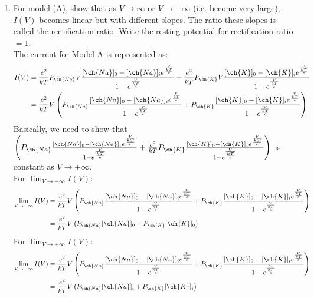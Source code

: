 \documentclass[11pt]{article}
\begin{document}
\begin{enumerate}[label=\arabic*.]
\begin{enumerate}[label=(\alph*)]
\item
For model (A), show that as $V \rightarrow \infty$ or $V \rightarrow -\infty$ (i.e. become very large), $I(V)$ becomes linear but with different slopes. The ratio these slopes is called the rectification ratio. Write the resting potential for rectification ratio $= 1$.
\vspace*{1\baselineskip}
\\
The current for Model A is represented as:
\begin{align*}
I(V) &= \frac{e^2} {kT} P_{\ch{Na}} V \frac{[\ch{Na}]_0 - [\ch{Na}]_i e^{\frac{V} {\frac{kT} {e}}}} {1 - e^{\frac{V} {\frac{kT} {e}}}} + \frac{e^2} {kT} P_{\ch{K}} V \frac{[\ch{K}]_0 - [\ch{K}]_i e^{\frac{V} {\frac{kT} {e}}}} {1 - e^{\frac{V} {\frac{kT} {e}}}} \\
&= \frac{e^2} {kT} V \left(P_{\ch{Na}} \frac{[\ch{Na}]_0 - [\ch{Na}]_i e^{\frac{V} {\frac{kT} {e}}}} {1 - e^{\frac{V} {\frac{kT} {e}}}} + P_{\ch{K}} \frac{[\ch{K}]_0 - [\ch{K}]_i e^{\frac{V} {\frac{kT} {e}}}} {1 - e^{\frac{V} {\frac{kT} {e}}}}\right)
\end{align*}
Basically, we need to show that $\left(P_{\ch{Na}} \frac{[\ch{Na}]_0 - [\ch{Na}]_i e^{\frac{V} {\frac{kT} {e}}}} {1 - e^{\frac{V} {\frac{kT} {e}}}} + \frac{e^2} {kT} P_{\ch{K}} \frac{[\ch{K}]_0 - [\ch{K}]_i e^{\frac{V} {\frac{kT} {e}}}} {1 - e^{\frac{V} {\frac{kT} {e}}}}\right)$ is constant as $V \rightarrow \pm \infty$. \\
For $\lim_{V \rightarrow -\infty} I(V)$:
\begin{align*}
\lim_{V \rightarrow -\infty} I(V) &= \frac{e^2} {kT} V \left(P_{\ch{Na}} \frac{[\ch{Na}]_0 - [\ch{Na}]_i e^{\frac{V} {\frac{kT} {e}}}} {1 - e^{\frac{V} {\frac{kT} {e}}}} + P_{\ch{K}} \frac{[\ch{K}]_0 - [\ch{K}]_i e^{\frac{V} {\frac{kT} {e}}}} {1 - e^{\frac{V} {\frac{kT} {e}}}}\right) \\
&= \frac{e^2} {kT} V \left(P_{\ch{Na}} [\ch{Na}]_0 + P_{\ch{K}} [\ch{K}]_0\right) \\
\end{align*}
For $\lim_{V \rightarrow +\infty} I(V)$:
\begin{align*}
\lim_{V \rightarrow -\infty} I(V) &= \frac{e^2} {kT} V \left(P_{\ch{Na}} \frac{[\ch{Na}]_0 - [\ch{Na}]_i e^{\frac{V} {\frac{kT} {e}}}} {1 - e^{\frac{V} {\frac{kT} {e}}}} + P_{\ch{K}} \frac{[\ch{K}]_0 - [\ch{K}]_i e^{\frac{V} {\frac{kT} {e}}}} {1 - e^{\frac{V} {\frac{kT} {e}}}}\right) \\
&= \frac{e^2} {kT} V \left(P_{\ch{Na}} [\ch{Na}]_i + P_{\ch{K}} [\ch{K}]_i\right) \\

\end{align*}
\end{enumerate}
\end{enumerate}
\end{document}
